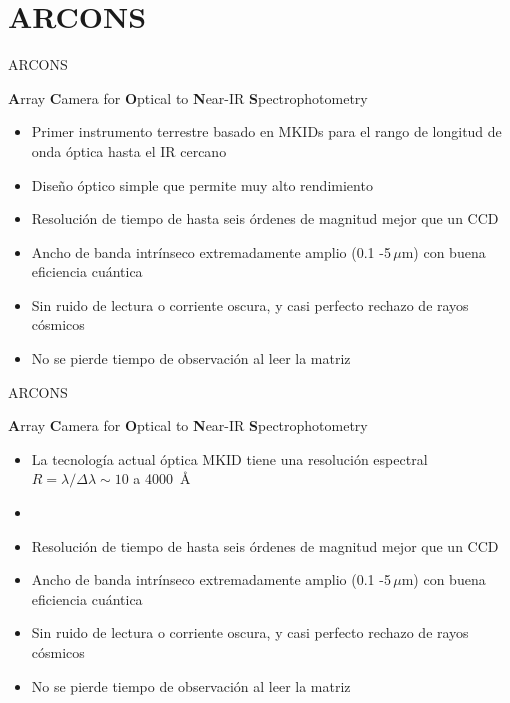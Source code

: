 \documentclass[ignorenonframetext,12pt]{beamer}
\begin{document}
\section{ARCONS}
\begin{frame}{ARCONS}

				\textbf{A}rray \textbf{C}amera for \textbf{O}ptical to \textbf{N}ear-IR
				\textbf{S}pectrophotometry
				\begin{itemize}
								\item Primer instrumento terrestre basado en MKIDs para el rango de
												longitud de onda óptica hasta el IR cercano
								\item Diseño óptico simple que permite muy alto rendimiento
								\item Resolución de tiempo de hasta seis órdenes de magnitud
												mejor que un CCD
								\item Ancho de banda intrínseco extremadamente amplio (0.1
												-5\,$\mu$m) con buena eficiencia cuántica
								\item Sin ruido de lectura o corriente oscura, y casi perfecto
												rechazo de rayos cósmicos
								\item No se pierde tiempo de observación al leer la matriz
				\end{itemize}

\end{frame}

\begin{frame}{ARCONS}

				\textbf{A}rray \textbf{C}amera for \textbf{O}ptical to \textbf{N}ear-IR
				\textbf{S}pectrophotometry
				\begin{itemize}
								\item La tecnología actual óptica MKID tiene una resolución
												espectral $R = \lambda/\Delta \lambda \sim 10$ a
												\SI{4000}{\angstrom}
								\item 
								\item Resolución de tiempo de hasta seis órdenes de magnitud
												mejor que un CCD
								\item Ancho de banda intrínseco extremadamente amplio (0.1
												-5\,$\mu$m) con buena eficiencia cuántica
								\item Sin ruido de lectura o corriente oscura, y casi perfecto
												rechazo de rayos cósmicos
								\item No se pierde tiempo de observación al leer la matriz
				\end{itemize}

\end{frame}
\end{document}
